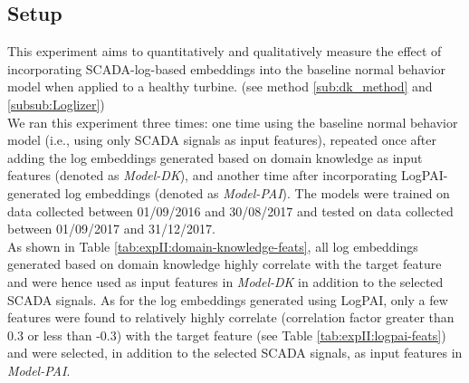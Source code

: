 \subsection{Setup}
This experiment aims to quantitatively and qualitatively measure 
the effect of incorporating SCADA-log-based embeddings into the baseline normal behavior model when applied to a healthy turbine.
(see method \ref{sub:dk_method} and \ref{subsub:Loglizer})\\
We ran this experiment three times: one time using the baseline normal behavior model (i.e., using only SCADA signals as input features), 
repeated once after adding the log embeddings generated based on domain knowledge as input features (denoted as \emph{Model-DK}), and 
another time after incorporating LogPAI-generated log embeddings (denoted as \emph{Model-PAI}).
The models were trained on data collected between 01/09/2016 and 30/08/2017 and tested on data collected between
01/09/2017 and 31/12/2017.\\
As shown in Table \ref{tab:expII:domain-knowledge-feats}, all log embeddings generated based on domain knowledge highly correlate with the target feature 
and were hence used as input features in \emph{Model-DK} in addition to the selected SCADA signals.
As for the log embeddings generated using LogPAI, only a few features were found to relatively highly correlate (correlation factor greater than 0.3 or less than -0.3) 
with the target feature (see Table \ref{tab:expII:logpai-feats}) and were selected, in addition to the selected SCADA signals, as input features in \emph{Model-PAI}.
